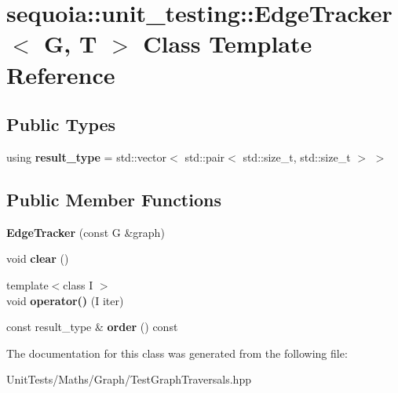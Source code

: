 \hypertarget{classsequoia_1_1unit__testing_1_1_edge_tracker}{}\section{sequoia\+::unit\+\_\+testing\+::Edge\+Tracker$<$ G, T $>$ Class Template Reference}
\label{classsequoia_1_1unit__testing_1_1_edge_tracker}
\subsection*{Public Types}
\begin{DoxyCompactItemize}
\item 
\mbox{\label{classsequoia_1_1unit__testing_1_1_edge_tracker_a2a570ea981a761159e91a000a87b6ed4}} 
using {\bfseries result\+\_\+type} = std\+::vector$<$ std\+::pair$<$ std\+::size\+\_\+t, std\+::size\+\_\+t $>$ $>$
\end{DoxyCompactItemize}
\subsection*{Public Member Functions}
\begin{DoxyCompactItemize}
\item 
\mbox{\label{classsequoia_1_1unit__testing_1_1_edge_tracker_a6c5c091e69f3140152e424d389e88236}} 
{\bfseries Edge\+Tracker} (const G \&graph)
\item 
\mbox{\label{classsequoia_1_1unit__testing_1_1_edge_tracker_a274bde430d3de1139f76df0b75fcc69d}} 
void {\bfseries clear} ()
\item 
\mbox{\label{classsequoia_1_1unit__testing_1_1_edge_tracker_aeb40748e76b3ca8c6a34bf6b869518b1}} 
{\footnotesize template$<$class I $>$ }\\void {\bfseries operator()} (I iter)
\item 
\mbox{\label{classsequoia_1_1unit__testing_1_1_edge_tracker_a1ec0ce14e3209c12aa549a47b771bcd3}} 
const result\+\_\+type \& {\bfseries order} () const
\end{DoxyCompactItemize}


The documentation for this class was generated from the following file\+:\begin{DoxyCompactItemize}
\item 
Unit\+Tests/\+Maths/\+Graph/Test\+Graph\+Traversals.\+hpp\end{DoxyCompactItemize}
